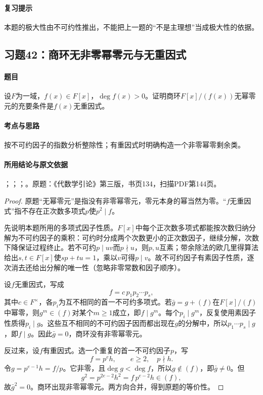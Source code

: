 \paragraph{复习提示}

本题的极大性由不可约性推出，不能把上一题的“不是主理想”当成极大性的依据。



\subsection{习题42：商环无非零幂零元与无重因式}

\label{ex:3:42}

\paragraph{题目}

设$F$为一域，$f(x)\in F[x]$，$\deg f(x)>0$。证明商环$F[x]/(f(x))$无幂零元的充要条件是$f(x)$无重因式。

\paragraph{考点与思路}

按不可约因子的指数分析整除性；有重因式时明确构造一个非零幂零剩余类。

\paragraph{所用结论与原文依据}

；；；。原题：《代数学引论》第三版，书页134，扫描PDF第144页。


\begin{proof}

原题“无幂零元”是指没有非零幂零元，零元本身的幂当然为零。“$f$无重因式”指不存在正次数多项式$p$使$p^2\mid f$。

先说明本题所用的多项式因子性质。$F[x]$中每个正次数多项式都能按次数归纳分解为不可约因子的乘积：可约时分成两个次数更小的正次数因子，继续分解，次数下降保证过程终止。若不可约$p\mid uv$而$p\nmid u$，则$p,u$互素；带余除法的欧几里得算法给出$s,t\in F[x]$使$sp+tu=1$，乘以$v$可得$p\mid v$。故不可约因子有素因子性质，逐次消去还给出分解的唯一性（忽略非零常数和因子顺序）。

设$f$无重因式，写成
\[
f=c\,p_1p_2\cdots p_s,
\]
其中$c\in F^\times$，各$p_i$为互不相同的首一不可约多项式。若$\bar g=g+(f)$在$F[x]/(f)$中幂零，则$g^m\in(f)$对某个$m\ge1$成立，即$f\mid g^m$。每个$p_i\mid g^m$，反复使用素因子性质得$p_i\mid g$。这些互不相同的不可约因子因而都出现在$g$的分解中，所以$p_1\cdots p_s\mid g$，即$f\mid g$。因此$\bar g=0$，商环没有非零幂零元。

反过来，设$f$有重因式。选一个重复的首一不可约因子$p$，写
\[
f=p^e h,\qquad e\ge2,\quad p\nmid h.
\]
令$g=p^{e-1}h=f/p$。它非零，且$\deg g<\deg f$，所以$g\notin(f)$，即$\bar g\ne0$。但
\[
g^2=p^{2e-2}h^2=f\,p^{e-2}h\in(f),
\]
故$\bar g^2=0$。商环出现非零幂零元。两方向合并，得到原题的等价性。

\end{proof}

